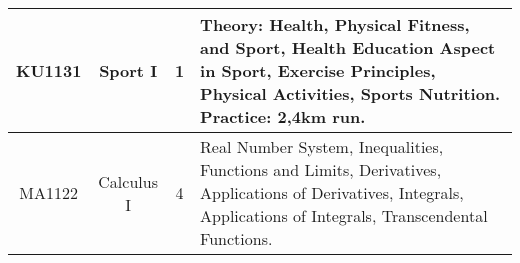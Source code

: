 \documentclass{article}
\begin{document}
\begin{center}
\begin{tabular}{ | c | c | c | p{7cm} |}
            KU1131 & Sport I & 1 & Theory: Health, Physical Fitness, and Sport, Health Education Aspect in Sport, Exercise Principles, Physical Activities, Sports Nutrition. Practice: 2,4km run. \\ \hline 

            MA1122 & Calculus I & 4 & Real Number System, Inequalities, Functions and Limits, Derivatives, Applications of Derivatives, Integrals, Applications of Integrals, Transcendental Functions.   \\ \hline                                    
            												        
        \end{tabular}
    \end{center} 
    
    \newpage
   
\end{document}
